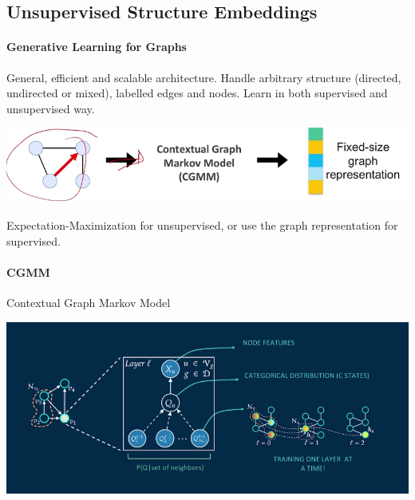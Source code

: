 \documentclass[10pt]{report}
\begin{document}
\subsection{Unsupervised Structure Embeddings}
\paragraph{Generative Learning for Graphs} General, efficient and scalable architecture. Handle arbitrary structure (directed, undirected or mixed), labelled edges and nodes. Learn in both supervised and unsupervised way.
\begin{center}
	\includegraphics[scale=0.5]{202.png}
\end{center}
Expectation-Maximization for unsupervised, or use the graph representation for supervised.
\paragraph{CGMM} Contextual Graph Markov Model
\begin{center}
	\includegraphics[scale=0.5]{203.png}
\end{center}
\end{document}
